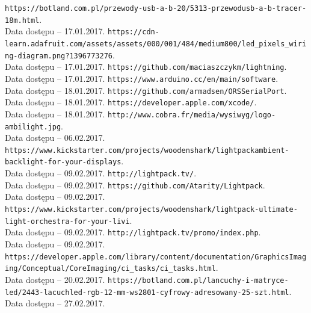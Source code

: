 \documentclass[12pt]{report}
\begin{document}
\begin{thebibliography}{99}
 {\tt https://botland.com.pl/przewody-usb-a-b-20/5313-przewod\-usb-a-b-tracer-18m.html}.\\Data dostępu -- 17.01.2017.
 {\tt https://cdn-learn.adafruit.com/assets/assets/000/001/484/\-medium800/led\_pixels\_wiring-diagram.png?1396773276}.\\Data dostępu -- 17.01.2017.
 {\tt https://github.com/maciaszczykm/lightning}.\\Data dostępu -- 17.01.2017.
 {\tt https://www.arduino.cc/en/main/software}.\\Data dostępu -- 18.01.2017.
 {\tt https://github.com/armadsen/ORSSerialPort}.\\Data dostępu -- 18.01.2017.
 {\tt https://developer.apple.com/xcode/}.\\Data dostępu -- 18.01.2017.
 {\tt http://www.cobra.fr/media/wysiwyg/logo-ambilight.jpg}. \\Data dostępu -- 06.02.2017.
 {\tt https://www.kickstarter.com/projects/woodenshark/lightpack\-ambient-backlight-for-your-displays}. \\Data dostępu -- 09.02.2017.
 {\tt http://lightpack.tv/}. \\Data dostępu -- 09.02.2017.
 {\tt https://github.com/Atarity/Lightpack}. \\Data dostępu -- 09.02.2017.
 {\tt https://www.kickstarter.com/projects/woodenshark/lightpack-ultimate-light-orchestra-for-your-livi}. \\Data dostępu -- 09.02.2017.
 {\tt http://lightpack.tv/promo/index.php}. \\Data dostępu -- 09.02.2017.
 {\tt https://developer.apple.com/library/content/\-documentation/GraphicsImaging/Conceptual/CoreImaging/\-ci\_tasks/ci\_tasks.html}. \\Data dostępu -- 20.02.2017.
 {\tt https://botland.com.pl/lancuchy-i-matryce-led/2443-lacuch\-led-rgb-12-mm-ws2801-cyfrowy-adresowany-25-szt.html}. \\Data dostępu -- 27.02.2017. 
\end{thebibliography}

\listoffigures

\listoftables

\lstlistoflistings
\end{document}
